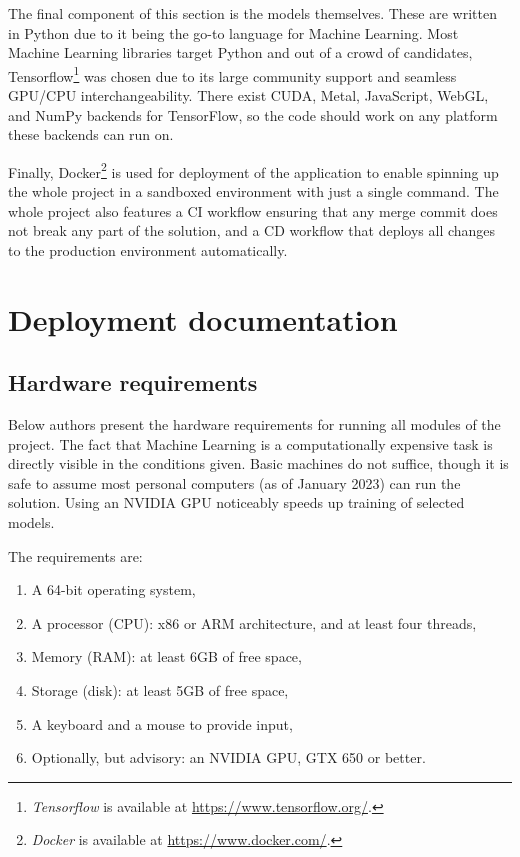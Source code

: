\documentclass[a4paper, 11pt, twoside]{report}
\theoremstyle{definition}
\begin{document}
The final component of this section is the models themselves. These are written in Python due to it being the go-to language for Machine Learning. Most Machine Learning libraries target Python and out of a crowd of candidates, Tensorflow\footnote{\textit{Tensorflow} is available at \url{https://www.tensorflow.org/}.} was chosen due to its large community support and seamless GPU/CPU interchangeability. There exist CUDA, Metal, JavaScript, WebGL, and NumPy backends for TensorFlow, so the code should work on any platform these backends can run on. \par
Finally, Docker\footnote{\textit{Docker} is available at \url{https://www.docker.com/}.} is used for deployment of the application to enable spinning up the whole project in a sandboxed environment with just a single command. The whole project also features a CI workflow ensuring that any merge commit does not break any part of the solution, and a CD workflow that deploys all changes to the production environment automatically. \par


\section{Deployment documentation}

\subsection{Hardware requirements}

Below authors present the hardware requirements for running all modules of the project. The fact that Machine Learning is a computationally expensive task is directly visible in the conditions given. Basic machines do not suffice, though it is safe to assume most personal computers (as of January 2023) can run the solution. Using an NVIDIA GPU noticeably speeds up training of selected models. \par
The requirements are:

\begin{enumerate}
    \item A 64-bit operating system,
    \item A processor (CPU): x86 or ARM architecture, and at least four threads,
    \item Memory (RAM): at least 6GB of free space,
    \item Storage (disk): at least 5GB of free space,
    \item A keyboard and a mouse to provide input,
    \item Optionally, but advisory: an NVIDIA GPU, GTX 650 or better.
\end{enumerate} \par
\end{document}
